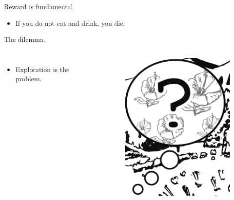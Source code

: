 \documentclass[10pt]{beamer}
\begin{document}
\begin{frame}[fragile]{Reward is fundamental.}
\begin{itemize}
    \item If you do not eat and drink, you die.
\end{itemize}
\end{frame}

\begin{frame}[fragile]{The dilemma.}
\begin{columns}
\centering
\begin{itemize}
    \item Exploration is the problem.
\end{itemize}

\centering
\begin{figure}
    \centering
    \includegraphics[scale=1.5]{images/bee_explore.png} 
    \caption{}
\end{figure}
\end{columns}
\end{frame}
\end{document}
